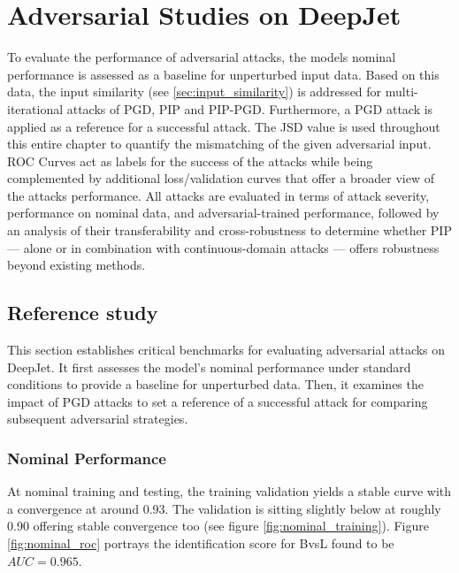 \chapter{Adversarial Studies on DeepJet}

To evaluate the performance of adversarial attacks, the models nominal performance is assessed as a baseline for unperturbed input data. Based on this data, the input similarity (see \ref{sec:input_similarity}) is addressed for multi-iterational attacks of PGD, PIP and PIP-PGD. Furthermore, a PGD attack is applied as a reference for a successful attack. The JSD value is used throughout this entire chapter to quantify the mismatching of the given adversarial input. ROC Curves act as labels for the success of the attacks while being complemented by additional loss/validation curves that offer a broader view of the attacks performance. All attacks are evaluated in terms of attack severity, performance on nominal data, and adversarial-trained performance, followed by an analysis of their transferability and cross-robustness to determine whether PIP — alone or in combination with continuous-domain attacks — offers robustness beyond existing methods.

\section{Reference study}

This section establishes critical benchmarks for evaluating adversarial attacks on DeepJet. It first assesses the model's nominal performance under standard conditions to provide a baseline for unperturbed data. Then, it examines the impact of PGD attacks to set a reference of a successful attack for comparing subsequent adversarial strategies.

\subsection{Nominal Performance}

At nominal training and testing, the training validation yields a stable curve with a convergence at around 0.93. The validation is sitting slightly below at roughly 0.90 offering stable convergence too (see figure \ref{fig:nominal_training}). Figure \ref{fig:nominal_roc} portrays the identification score for BvsL found to be $AUC=0.965$.

